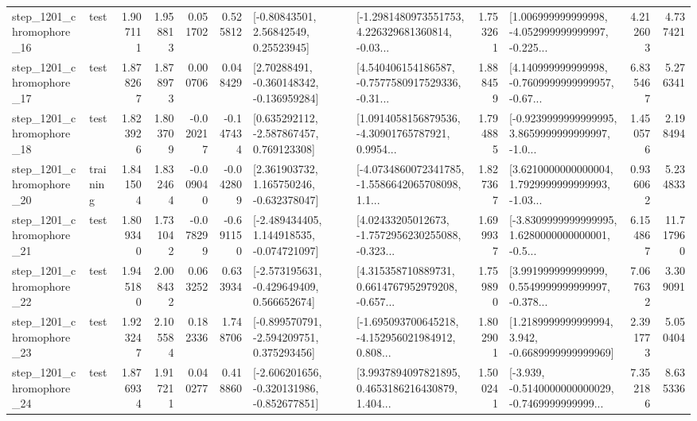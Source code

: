 \begin{tabular}{llrrrrllrlrr}
 step\_1201\_chromophore\_16 &      test &      1.907111 &    1.958813 &      0.051702 &  0.525812 &       [-0.80843501, 2.56842549, 0.25523945] &  [-1.2981480973551753, 4.226329681360814, -0.03... &       1.753261 &  [1.006999999999998, -4.052999999999997, -0.225... &            4.212603 &          4.737421 \\
 step\_1201\_chromophore\_17 &      test &      1.878267 &    1.878973 &      0.000706 &  0.048429 &    [2.70288491, -0.360148342, -0.136959284] &  [4.540406154186587, -0.7577580917529336, -0.31... &       1.888459 &  [4.140999999999998, -0.7609999999999957, -0.67... &            6.835467 &          5.276341 \\
 step\_1201\_chromophore\_18 &      test &      1.823926 &    1.803709 &     -0.020217 & -0.147434 &    [0.635292112, -2.587867457, 0.769123308] &  [1.0914058156879536, -4.30901765787921, 0.9954... &       1.794885 &  [-0.9239999999999995, 3.8659999999999997, -1.0... &            1.450576 &          2.198494 \\
 step\_1201\_chromophore\_20 &  training &      1.841504 &    1.832464 &     -0.009040 & -0.042809 &    [2.361903732, 1.165750246, -0.632378047] &  [-4.0734860072341785, -1.5586642065708098, 1.1... &       1.827367 &  [3.6210000000000004, 1.7929999999999993, -1.03... &            0.936062 &          5.234833 \\
 step\_1201\_chromophore\_21 &      test &      1.809340 &    1.731042 &     -0.078299 & -0.691150 &   [-2.489434405, 1.144918535, -0.074721097] &  [4.02433205012673, -1.7572956230255088, -0.323... &       1.699937 &  [-3.8309999999999995, 1.6280000000000001, -0.5... &            6.154867 &         11.717960 \\
 step\_1201\_chromophore\_22 &      test &      1.945180 &    2.008432 &      0.063252 &  0.633934 &   [-2.573195631, -0.429649409, 0.566652674] &  [4.315358710889731, 0.6614767952979208, -0.657... &       1.759890 &  [3.991999999999999, 0.5549999999999997, -0.378... &            7.067632 &          3.309091 \\
 step\_1201\_chromophore\_23 &      test &      1.923247 &    2.105584 &      0.182336 &  1.748706 &   [-0.899570791, -2.594209751, 0.375293456] &  [-1.695093700645218, -4.152956021984912, 0.808... &       1.802901 &   [1.2189999999999994, 3.942, -0.6689999999999969] &            2.391773 &          5.050404 \\
 step\_1201\_chromophore\_24 &      test &      1.876934 &    1.917211 &      0.040277 &  0.418860 &  [-2.606201656, -0.320131986, -0.852677851] &  [3.9937894097821895, 0.4653186216430879, 1.404... &       1.500241 &  [-3.939, -0.5140000000000029, -0.7469999999999... &            7.352186 &          8.635336 \\

\end{tabular}
